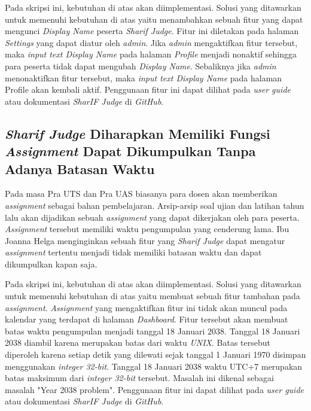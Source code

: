 Pada skripsi ini, kebutuhan di atas akan diimplementasi. Solusi yang ditawarkan untuk memenuhi kebutuhan di atas yaitu menambahkan sebuah fitur yang dapat mengunci \textit{Display Name} peserta \textit{Sharif Judge}. Fitur ini diletakan pada halaman \textit{Settings} yang dapat diatur oleh \textit{admin}. Jika \textit{admin} mengaktifkan fitur tersebut, maka \textit{input text Display Name} pada halaman \textit{Profile} menjadi nonaktif sehingga para peserta tidak dapat mengubah \textit{Display Name}. Sebaliknya jika \textit{admin} menonaktifkan fitur tersebut, maka \textit{input text Display Name} pada halaman Profile akan kembali aktif. Penggunaan fitur ini dapat dilihat pada \textit{user guide} atau dokumentasi \textit{SharIF Judge} di \textit{GitHub}.

\subsection{\textit{Sharif Judge} Diharapkan Memiliki Fungsi \textit{Assignment} Dapat Dikumpulkan Tanpa Adanya Batasan Waktu}
Pada masa Pra UTS dan Pra UAS biasanya para dosen akan memberikan \textit{assignment} sebagai bahan pembelajaran. Arsip-arsip soal ujian dan latihan tahun lalu akan dijadikan sebuah \textit{assignment} yang dapat dikerjakan oleh para peserta. \textit{Assignment} tersebut memiliki waktu pengumpulan yang cenderung lama. Ibu Joanna Helga menginginkan sebuah fitur yang \textit{Sharif Judge} dapat mengatur \textit{assignment} tertentu menjadi tidak memiliki batasan waktu dan dapat dikumpulkan kapan saja. 

Pada skripsi ini, kebutuhan di atas akan diimplementasi. Solusi yang ditawarkan untuk memenuhi kebutuhan di atas yaitu membuat sebuah fitur tambahan pada \textit{assignment}. \textit{Assignment} yang mengaktifkan fitur ini tidak akan muncul pada kalendar yang terdapat di halaman \textit{Dashboard}. Fitur tersebut akan membuat batas waktu pengumpulan menjadi tanggal 18 Januari 2038. Tanggal 18 Januari 2038 diambil karena merupakan batas dari waktu \textit{UNIX}. Batas tersebut diperoleh karena setiap detik yang dilewati sejak tanggal 1 Januari 1970 disimpan menggunakan \textit{integer 32-bit}. Tanggal 18 Januari 2038 waktu UTC+7 merupakan batas maksimum dari \textit{integer 32-bit} tersebut. Masalah ini dikenal sebagai masalah "Year 2038 problem". Penggunaan fitur ini dapat dilihat pada \textit{user guide} atau dokumentasi \textit{SharIF Judge} di \textit{GitHub}.


